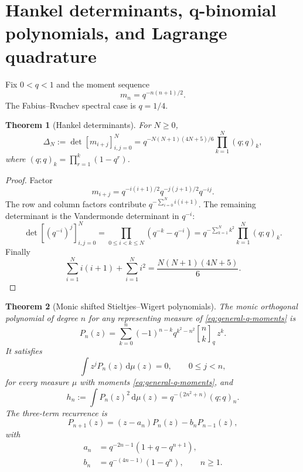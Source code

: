 \documentclass[11pt,oneside]{article}
\numberwithin{equation}{section}
\theoremstyle{plain}
\newtheorem{theorem}{Theorem}[section]
\theoremstyle{definition}
\theoremstyle{remark}
\newcommand{\dd}{\,\mathrm d}
\newcommand{\qbinom}[3]{\genfrac{[}{]}{0pt}{}{#1}{#2}_{#3}}
\begin{document}
\section{Hankel determinants, q-binomial polynomials, and Lagrange quadrature}
\label{sec:q-orthogonal}

Fix $0<q<1$ and the moment sequence
\begin{equation}
 m_n=q^{-n(n+1)/2}.
 \label{eq:general-q-moments}
\end{equation}
The Fabius--Rvachev spectral case is $q=1/4$.

\begin{theorem}[Hankel determinants]
\label{thm:Hankel-determinants}
For $N\geq0$,
\begin{equation}
 \boxed{
 \Delta_N:=\det[m_{i+j}]_{i,j=0}^{N}
 =q^{-N(N+1)(4N+5)/6}
 \prod_{k=1}^{N}(q;q)_k,}
 \label{eq:Hankel-determinant}
\end{equation}
where $(q;q)_k=\prod_{r=1}^k(1-q^r)$.
\end{theorem}

\begin{proof}
Factor
\[
 m_{i+j}=q^{-i(i+1)/2}q^{-j(j+1)/2}q^{-ij}.
\]
The row and column factors contribute
$q^{-\sum_{i=0}^N i(i+1)}$.  The remaining determinant is the Vandermonde determinant in
$q^{-i}$:
\[
 \det[(q^{-i})^j]_{i,j=0}^N
 =\prod_{0\leq i<k\leq N}(q^{-k}-q^{-i})
 =q^{-\sum_{k=1}^Nk^2}\prod_{k=1}^{N}(q;q)_k.
\]
Finally
\[
 \sum_{i=1}^{N}i(i+1)+\sum_{i=1}^{N}i^2
 =\frac{N(N+1)(4N+5)}6.
\]
\end{proof}

\begin{theorem}[Monic shifted Stieltjes--Wigert polynomials]
\label{thm:SW-polynomials}
The monic orthogonal polynomial of degree $n$ for any representing measure of
\eqref{eq:general-q-moments} is
\begin{equation}
 \boxed{
 P_n(z)=\sum_{k=0}^{n}
 (-1)^{n-k}q^{k^2-n^2}\qbinom{n}{k}{q}\,z^k.}
 \label{eq:SW-polynomial}
\end{equation}
It satisfies
\begin{equation}
 \int z^jP_n(z)\dd\mu(z)=0,
 \qquad0\leq j<n,
 \label{eq:SW-orthogonality}
\end{equation}
for every measure $\mu$ with moments \eqref{eq:general-q-moments}, and
\begin{equation}
 h_n:=\int P_n(z)^2\dd\mu(z)
 =q^{-(2n^2+n)}(q;q)_n.
 \label{eq:SW-norm}
\end{equation}
The three-term recurrence is
\begin{equation}
 P_{n+1}(z)=(z-a_n)P_n(z)-b_nP_{n-1}(z),
 \label{eq:SW-recurrence}
\end{equation}
with
\begin{align}
 a_n&=q^{-2n-1}(1+q-q^{n+1}),\label{eq:an}\\
 b_n&=q^{-(4n-1)}(1-q^n),\qquad n\geq1.
 \label{eq:bn}
\end{align}
\end{theorem}
\end{document}

